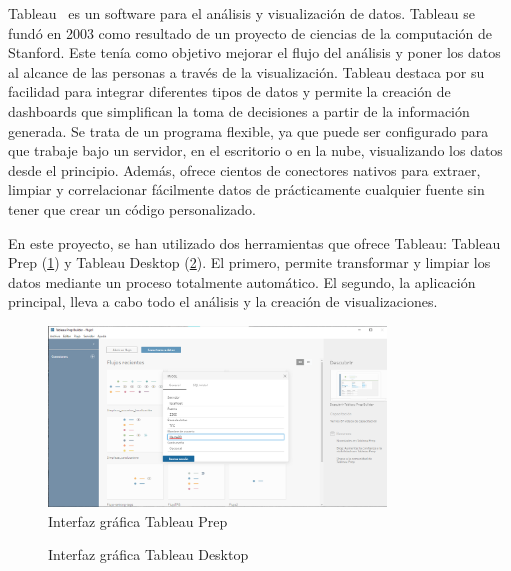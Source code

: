 \documentclass[a4paper, 12pt]{book}
\begin{document}
Tableau~\cite{Tableau} es un software para el análisis y visualización de datos. Tableau se fundó en 2003 como resultado de un proyecto de ciencias de la computación de Stanford. Este tenía como objetivo mejorar el flujo del análisis y poner los datos al alcance de las personas a través de la visualización.  
Tableau destaca por su facilidad para integrar diferentes tipos de datos y permite la creación de dashboards que simplifican la toma de decisiones a partir de la información generada. Se trata de un programa flexible, ya que puede ser configurado para que trabaje bajo un servidor, en el escritorio o en la nube, visualizando los datos desde el principio. Además, ofrece cientos de conectores nativos para extraer, limpiar y correlacionar fácilmente datos de prácticamente cualquier fuente sin tener que crear un código personalizado.

En este proyecto, se han utilizado dos herramientas que ofrece Tableau: Tableau Prep (\ref{figura:Tableau_Prep}) y Tableau Desktop (\ref{figura:Tableau_desktop}). El primero, permite transformar y limpiar los datos mediante un proceso totalmente automático. El segundo, la aplicación principal, lleva a cabo todo el análisis y la creación de visualizaciones. 

\begin{figure}[ht]
    \centering
        \includegraphics[width=0.8\textwidth]{img/PREP.png}
        \caption{Interfaz gráfica Tableau Prep}
        \label{figura:Tableau_Prep}
    \end{figure}

\begin{figure}[ht]
 \centering
 \caption{Interfaz gráfica Tableau Desktop}
 \label{figura:Tableau_desktop}
\end{figure}
    
\end{document}
